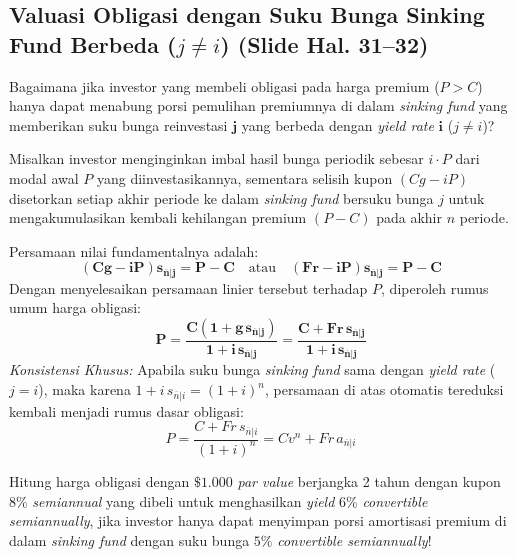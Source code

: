 \documentclass[11pt,a4paper]{article}
\begin{document}
\subsection{Valuasi Obligasi dengan Suku Bunga Sinking Fund Berbeda (\texorpdfstring{$j \neq i$}{j != i}) (Slide Hal. 31--32)}

Bagaimana jika investor yang membeli obligasi pada harga premium ($P > C$) hanya dapat menabung porsi pemulihan premiumnya di dalam \textit{sinking fund} yang memberikan suku bunga reinvestasi $\mathbf{j}$ yang berbeda dengan \textit{yield rate} $\mathbf{i}$ ($j \neq i$)?

\begin{theorembox}
Misalkan investor menginginkan imbal hasil bunga periodik sebesar $i \cdot P$ dari modal awal $P$ yang diinvestasikannya, sementara selisih kupon $(Cg - iP)$ disetorkan setiap akhir periode ke dalam \textit{sinking fund} bersuku bunga $j$ untuk mengakumulasikan kembali kehilangan premium $(P - C)$ pada akhir $n$ periode.

Persamaan nilai fundamentalnya adalah:
\begin{equation}
    \mathbf{(Cg - iP) s_{\overline{n}|j} = P - C} \quad \text{atau} \quad \mathbf{(Fr - iP) s_{\overline{n}|j} = P - C}
\end{equation}
Dengan menyelesaikan persamaan linier tersebut terhadap $P$, diperoleh rumus umum harga obligasi:
\begin{equation}
    \mathbf{P = \frac{C(1 + g \, s_{\overline{n}|j})}{1 + i \, s_{\overline{n}|j}} = \frac{C + Fr \, s_{\overline{n}|j}}{1 + i \, s_{\overline{n}|j}}}
\end{equation}
\textit{Konsistensi Khusus:} Apabila suku bunga \textit{sinking fund} sama dengan \textit{yield rate} ($j = i$), maka karena $1 + i \, s_{\overline{n}|i} = (1+i)^n$, persamaan di atas otomatis tereduksi kembali menjadi rumus dasar obligasi:
\begin{equation*}
    P = \frac{C + Fr \, s_{\overline{n}|i}}{(1+i)^n} = C v^n + Fr \, a_{\overline{n}|i}
\end{equation*}
\end{theorembox}

\begin{examplebox}
Hitung harga obligasi dengan $\$1.000$ \textit{par value} berjangka 2 tahun dengan kupon $8\%$ \textit{semiannual} yang dibeli untuk menghasilkan \textit{yield} $6\%$ \textit{convertible semiannually}, jika investor hanya dapat menyimpan porsi amortisasi premium di dalam \textit{sinking fund} dengan suku bunga $5\%$ \textit{convertible semiannually}!
\end{examplebox}
\end{document}
